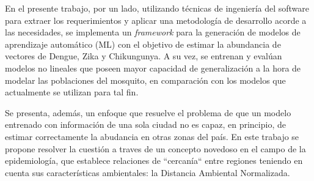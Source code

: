  \par En el presente trabajo, por un lado, utilizando técnicas de
    ingeniería del software para extraer los requerimientos y aplicar una metodología
    de desarrollo acorde a las necesidades,
    se implementa un \textit{framework} para la generación de modelos de
    aprendizaje automático (ML) con el objetivo
    de estimar la abundancia de vectores de Dengue, Zika y Chikungunya.
    A su vez, se entrenan y evalúan modelos no lineales que poseen mayor
    capacidad de generalización a la hora de modelar las poblaciones del
    mosquito, en comparación con los modelos que actualmente se utilizan
    para tal fin.

  \par Se presenta, además, un enfoque que resuelve el problema de que
    un modelo entrenado con información de una sola ciudad no es capaz,
    en principio, de estimar correctamente la abudancia en otras zonas del país.
    En este trabajo
    se propone resolver la cuestión a traves de un concepto novedoso en el campo
    de la epidemiología, que establece
    relaciones de ``cercanía``
    entre regiones teniendo en cuenta sus características
    ambientales: la Distancia Ambiental Normalizada.
